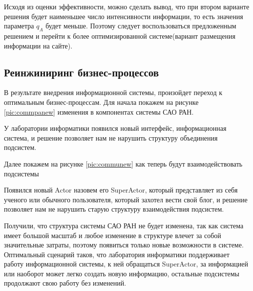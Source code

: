 Исходя из оценки эффективности, можно сделать вывод, что при втором варианте решения будет наименьшее число интенсивности информации, то есть значения параметра $q_A$ будет меньше. Поэтому следует воспользоваться предложенным решением и перейти к более оптимизированной системе(вариант размещения информации на сайте). 

\subsection{Реинжиниринг бизнес-процессов}

В результате внедрения информационной системы, произойдет переход к оптимальным бизнес-процессам. Для начала покажем на рисунке \ref{pic:commpanew} изменения в компонентах системы САО РАН. 


У лаборатории информатики появился новый интерфейс, информационная система, и решение позволяет нам не нарушить структуру объединения подсистем. 

Далее покажем на рисунке \ref{pic:communew} как теперь будут взаимодействовать подсистемы


Появился новый Actor назовем его SuperActor, который представляет из себя ученого или обычного пользователя, который захотел вести свой блог, и решение позволяет нам не нарушить старую структуру взаимодействия подсистем.

Получили, что структура системы САО РАН не будет изменена, так как система имеет большой масштаб и любое изменение в структуре влечет за собой значительные затраты, поэтому появиться только новые возможности в системе. Оптимальный сценарий таков, что лаборатория информатики поддерживает работу информационной системы, к ней обращаться SuperActor, за информацией или наоборот может легко создать новую информацию, остальные подсистемы продолжают свою работу без изменений. 
\pagebreak